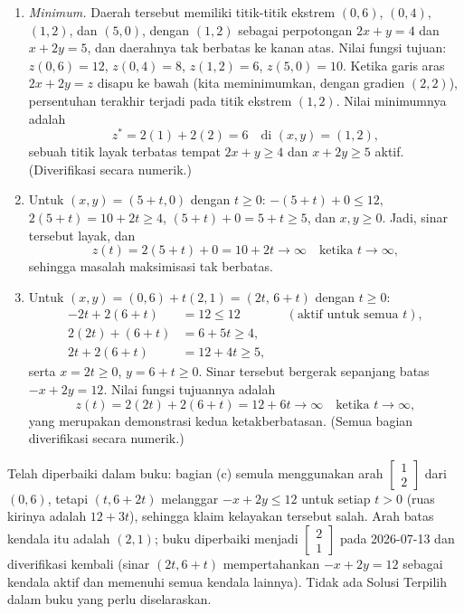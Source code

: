 \begin{enumerate}
\item \emph{Minimum.} Daerah tersebut memiliki titik-titik ekstrem $(0,6)$, $(0,4)$, $(1,2)$, dan $(5,0)$, dengan $(1,2)$ sebagai perpotongan $2x + y = 4$ dan $x + 2y = 5$, dan daerahnya tak berbatas ke kanan atas. Nilai fungsi tujuan: $z(0,6) = 12$, $z(0,4) = 8$, $z(1,2) = 6$, $z(5,0) = 10$. Ketika garis aras $2x + 2y = z$ disapu ke bawah (kita meminimumkan, dengan gradien $(2,2)$), persentuhan terakhir terjadi pada titik ekstrem $(1,2)$. Nilai minimumnya adalah
\[
z^* = 2(1) + 2(2) = 6 \quad \text{di } (x, y) = (1, 2),
\]
sebuah titik layak terbatas tempat $2x + y \geq 4$ dan $x + 2y \geq 5$ aktif. (Diverifikasi secara numerik.)
\item Untuk $(x, y) = (5 + t, 0)$ dengan $t \geq 0$: $-(5+t) + 0 \leq 12$, $2(5+t) = 10 + 2t \geq 4$, $(5+t) + 0 = 5 + t \geq 5$, dan $x, y \geq 0$. Jadi, sinar tersebut layak, dan
\[
z(t) = 2(5 + t) + 0 = 10 + 2t \to \infty \quad \text{ketika } t \to \infty,
\]
sehingga masalah maksimisasi tak berbatas.
\item Untuk $(x, y) = (0, 6) + t(2, 1) = (2t,\, 6 + t)$ dengan $t \geq 0$:
\[
\begin{aligned}
-2t + 2(6 + t) &= 12 \leq 12
  &&(\text{aktif untuk semua } t),\\
2(2t) + (6+t) &= 6 + 5t \geq 4,\\
2t + 2(6+t) &= 12 + 4t \geq 5,
\end{aligned}
\]
serta $x = 2t \geq 0$, $y = 6 + t \geq 0$. Sinar tersebut bergerak sepanjang batas $-x + 2y = 12$. Nilai fungsi tujuannya adalah
\[
z(t) = 2(2t) + 2(6 + t) = 12 + 6t \to \infty \quad \text{ketika } t \to \infty,
\]
yang merupakan demonstrasi kedua ketakberbatasan. (Semua bagian diverifikasi secara numerik.)
\end{enumerate}

\begin{qaflag}
Telah diperbaiki dalam buku: bagian (c) semula menggunakan arah $\begin{bmatrix}1\\2\end{bmatrix}$ dari $(0,6)$, tetapi $(t, 6+2t)$ melanggar $-x + 2y \leq 12$ untuk setiap $t > 0$ (ruas kirinya adalah $12 + 3t$), sehingga klaim kelayakan tersebut salah. Arah batas kendala itu adalah $(2,1)$; buku diperbaiki menjadi $\begin{bmatrix}2\\1\end{bmatrix}$ pada 2026-07-13 dan diverifikasi kembali (sinar $(2t, 6+t)$ mempertahankan $-x+2y = 12$ sebagai kendala aktif dan memenuhi semua kendala lainnya). Tidak ada Solusi Terpilih dalam buku yang perlu diselaraskan.
\end{qaflag}

